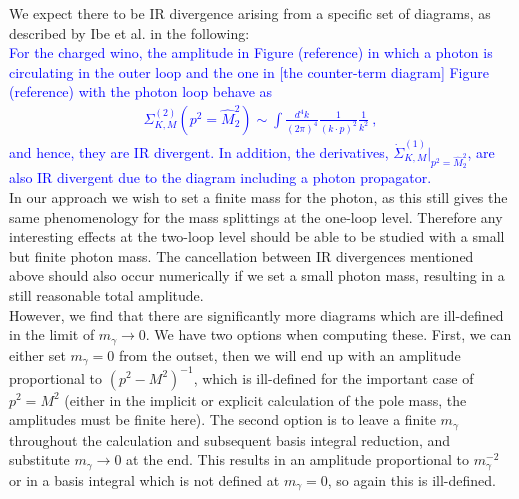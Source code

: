\documentclass[11pt]{article}
\begin{document}
We expect there to be IR divergence arising from a specific set of diagrams, as described by Ibe et al. in the following:\\

\textcolor{blue}{
For the charged wino, the amplitude in Figure (reference) in which a photon is circulating
in the outer loop and the one in [the counter-term diagram] Figure (reference) with the photon loop behave as
\begin{eqnarray}
\Sigma_{K,M}^{(2)}(p^2=\hat{M}_2^2) \sim
\int \frac{d^4 k}{(2\pi)^4} \frac{1}{(k\cdot p)^2} \frac{1}{k^2} \ ,
\end{eqnarray}
and hence, they are IR divergent.
In addition, the derivatives, $\dot{\Sigma}_{K,M}^{(1)} |_{p^2=\hat{M}_2^2}$, 
are also IR divergent due to the diagram including a photon propagator. 
}\\

In our approach we wish to set a finite mass for the photon, as this still gives the same phenomenology for the mass splittings at the one-loop level.  Therefore any interesting effects at the two-loop level should be able to be studied with a small but finite photon mass.  The cancellation between IR divergences mentioned above should also occur numerically if we set a small photon mass, resulting in a still reasonable total amplitude.\\

However, we find that there are significantly more diagrams which are ill-defined in the limit of $m_{\gamma}\rightarrow 0$.  We have two options when computing these.  First, we can either set $m_{\gamma}=0$ from the outset, then we will end up with an amplitude proportional to $(p^2-M^2)^{-1}$, which is ill-defined for the important case of $p^2=M^2$ (either in the implicit or explicit calculation of the pole mass, the amplitudes must be finite here).  The second option is to leave a finite $m_{\gamma}$ throughout the calculation and subsequent basis integral reduction, and substitute $m_{\gamma}\rightarrow 0$ at the end.  This results in an amplitude proportional to $m_{\gamma}^{-2}$ or in a basis integral which is not defined at $m_{\gamma}=0$, so again this is ill-defined.\\
\end{document}
